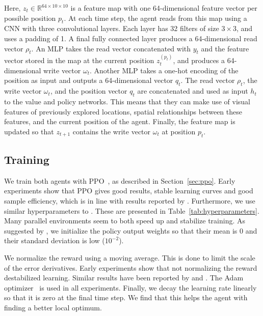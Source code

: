 Here, \(z_t \in \mathbb{R}^{64 \times 10 \times 10}\) is a feature map with one 64-dimensional feature vector per possible position \(p_t\).
At each time step, the agent reads from this map using a CNN with three convolutional layers.
Each layer has 32 filters of size \(3 \times 3\), and uses a padding of 1.
A final fully connected layer produces a 64-dimensional read vector \(\rho_t\).
An MLP takes the read vector concatenated with \(y_t\) and the feature vector stored in the map at the current position \(z_t^{(p_t)}\), and produces a 64-dimensional write vector \(\omega_{t}\).
Another MLP takes a one-hot encoding of the position as input and outputs a 64-dimensional vector \(q_t\).
The read vector \(\rho_t\), the write vector \(\omega_{t}\), and the position vector \(q_t\) are concatenated and used as input \(h_t\) to the value and policy networks.
This means that they can make use of visual features of previously explored locations, spatial relationships between these features, and the current position of the agent.
Finally, the feature map is updated so that \(z_{t+1}\) contains the write vector \(\omega_{t}\) at position \(p_t\).


\subsection{Training}

We train both agents with PPO~\cite{schulman_proximal_2017}, as described in Section~\ref{sec:ppo}.
Early experiments show that PPO gives good results, stable learning curves and good sample efficiency, which is in line with results reported by \cite{andrychowicz_what_2020}.
Furthermore, we use similar hyperparameters to \cite{cobbe_leveraging_2020}.
These are presented in Table~\ref{tab:hyperparameters}.
Many parallel environments seem to both speed up and stabilize training. 
As suggested by \cite{andrychowicz_what_2020}, we initialize the policy output weights so that their mean is 0 and their standard deviation is low (\(10^{-2}\)).

We normalize the reward using a moving average.
This is done to limit the scale of the error derivatives.
Early experiments show that not normalizing the reward destabilized learning. %
Similar results have been reported by \cite{andrychowicz_what_2020} and \cite{mnih_playing_2013}.
The Adam optimizer~\cite{kingma_adam_2017} is used in all experiments.
Finally, we decay the learning rate linearly so that it is zero at the final time step.
We find that this helps the agent with finding a better local optimum.

